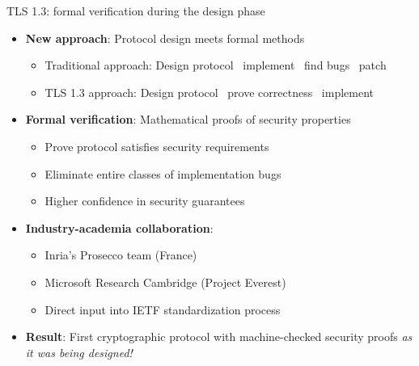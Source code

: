 \ifdefined\PRESENTATION\else\PassOptionsToClass{handout}{beamer}\fi\documentclass[aspectratio=169, lualatex]{beamer}
\begin{document}
\begin{frame}{TLS 1.3: formal verification during the design phase}
	\begin{itemize}
		\item \textbf{New approach}: Protocol design meets formal methods
		      \begin{itemize}
			      \item Traditional approach: Design protocol \rightarrow\ implement \rightarrow\ find bugs \rightarrow\ patch
			      \item TLS 1.3 approach: Design protocol \rightarrow\ prove correctness \rightarrow\ implement
		      \end{itemize}
		\item \textbf{Formal verification}: Mathematical proofs of security properties
		      \begin{itemize}
			      \item Prove protocol satisfies security requirements
			      \item Eliminate entire classes of implementation bugs
			      \item Higher confidence in security guarantees
		      \end{itemize}
		\item \textbf{Industry-academia collaboration}:
		      \begin{itemize}
			      \item Inria's Prosecco team (France)
			      \item Microsoft Research Cambridge (Project Everest)
			      \item Direct input into IETF standardization process
		      \end{itemize}
		\item \textbf{Result}: First cryptographic protocol with machine-checked security proofs \textit{as it was being designed!}
	\end{itemize}
\end{frame}
\end{document}

